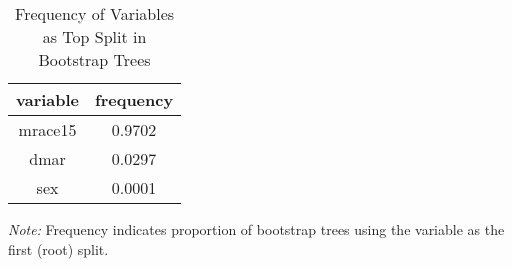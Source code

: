 \begin{table}[ht]
\centering
\begin{tabular}{cc}
 variable & frequency \\ 
\midrule
 mrace15 & 0.9702 \\ 
  dmar & 0.0297 \\ 
  sex & 0.0001 \\ 
  \end{tabular}
\caption*{\textit{Note:} Frequency indicates proportion of bootstrap trees using the variable as the first (root) split.}
\caption{Frequency of Variables as Top Split in Bootstrap Trees} 
\label{tab:top_var}
\end{table}
